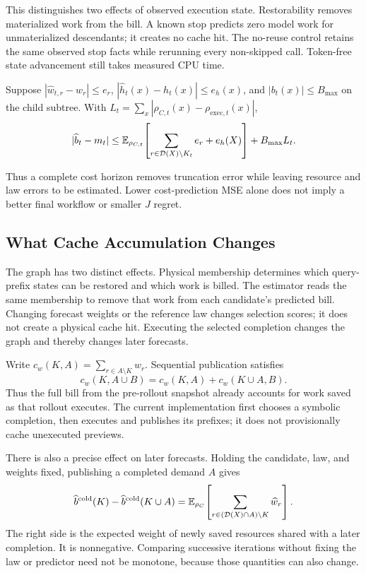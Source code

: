 This distinguishes two effects of observed execution state. Restorability
removes materialized work from the bill. A known stop predicts zero model work
for unmaterialized descendants; it creates no cache hit. The no-reuse control
retains the same observed stop facts while rerunning every non-skipped call.
Token-free state advancement still takes measured CPU time.

\begin{proposition}
\label{prop:error}
Suppose $|\widehat w_{t,r}-w_r|\le e_r$, $|\widehat h_t(x)-h_t(x)|\le e_h(x)$, and $|b_t(x)|\le B_{\max}$ on the child subtree. With $L_t=\sum_x|\rho_{C,t}(x)-\rho_{\mathrm{exec},t}(x)|$,
\begin{equation}
 |\widehat b_t-m_t|\le
 \mathbb{E}_{\rho_{C,t}}\!\left[\sum_{r\in\mathcal D(X)\setminus K_t}e_r+e_h(X)\right]
 +B_{\max}L_t.
 \label{eq:costerror}
\end{equation}
\end{proposition}
Thus a complete cost horizon removes truncation error while leaving resource and law errors to be estimated. Lower cost-prediction MSE alone does not imply a better final workflow or smaller $J$ regret.

\subsection{What Cache Accumulation Changes}
The graph has two distinct effects. Physical membership determines which query-prefix states can be restored and which work is billed. The estimator reads the same membership to remove that work from each candidate's predicted bill. Changing forecast weights or the reference law changes selection scores; it does not create a physical cache hit. Executing the selected completion changes the graph and thereby changes later forecasts.

Write $c_w(K,A)=\sum_{r\in A\setminus K}w_r$. Sequential publication satisfies
\begin{equation}
 c_w(K,A\cup B)=c_w(K,A)+c_w(K\cup A,B).
 \label{eq:sequentialcache}
\end{equation}
Thus the full bill from the pre-rollout snapshot already accounts for work saved as that rollout executes. The current implementation first chooses a symbolic completion, then executes and publishes its prefixes; it does not provisionally cache unexecuted previews.

There is also a precise effect on later forecasts. Holding the candidate, law, and weights fixed, publishing a completed demand $A$ gives
\begin{equation}
 \widehat b^{\mathrm{cold}}(K)-\widehat b^{\mathrm{cold}}(K\cup A)
 =\mathbb{E}_{\rho_C}\!\left[\sum_{r\in(\mathcal D(X)\cap A)\setminus K}\widehat w_r\right].
 \label{eq:cacheforecast}
\end{equation}
The right side is the expected weight of newly saved resources shared with a later completion. It is nonnegative. Comparing successive iterations without fixing the law or predictor need not be monotone, because those quantities can also change.

